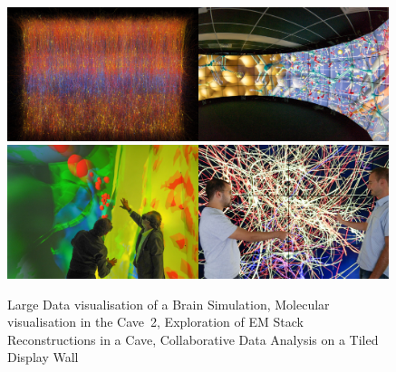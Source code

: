 \begin{figure}[h!t]%
\includegraphics[width=0.497\textwidth]{images/slices.jpg}\hfil\includegraphics[width=0.497\textwidth]{images/cave2.jpg}\\%
\includegraphics[width=0.497\textwidth]{images/cave.jpg}\hfil\includegraphics[width=0.497\textwidth]{images/tide.jpg}\\%
\caption{\label{FIG_teaser}Large Data visualisation of a
  Brain Simulation, Molecular visualisation in the Cave~2, Exploration of EM
  Stack Reconstructions in a Cave, Collaborative Data Analysis on a Tiled
  Display Wall}
\end{figure}

